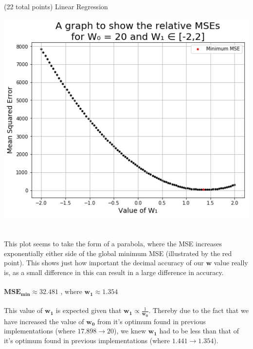 \documentclass[12pt]{article}
\begin{document}
\begin{question}{(22 total points) Linear Regression}
\begin{subquestion}
\begin{answerbox}{48em}
\includegraphics [width=1\textwidth]{images/q1g-graph.png}\\
\\
\\
This plot seems to take the form of a parabola, where the MSE increases exponentially either side of the global minimum MSE (illustrated by the red point). This shows just how important the decimal accuracy of our $\mathbf{w}$ value really is, as a small difference in this can result in a large difference in accuracy.\\
\\
$\mathbf{MSE_{min}} \approx 32.481$ ,  where $\mathbf{w_1} \approx 1.354$\\
\\
This value of $\mathbf{w_1}$ is expected given that $\mathbf{w_1} \propto \frac{1}{\mathbf{w_0}}$. Thereby due to the fact that we have increased the value of $\mathbf{w_0}$ from it's optimum found in previous implementations (where $17.898 \to 20$), we knew $\mathbf{w_1}$ had to be less than that of it's optimum found in previous implementations (where $1.441 \to 1.354$).
\end{answerbox}



\end{subquestion}


 
\end{question}
\end{document}
